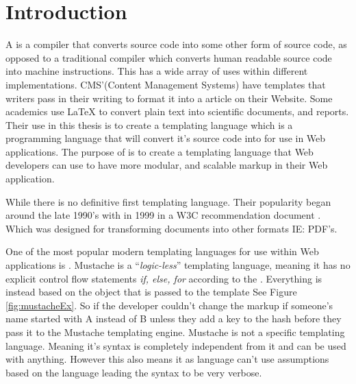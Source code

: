 \section{Introduction}

A \compiler{}  is a compiler that converts source code into some other form of source code, as opposed to a traditional compiler which converts human readable source code into machine instructions. This has a wide array of uses within different implementations. CMS'(Content Management Systems) have templates that writers pass in their writing to format it into a  article on their Website. Some academics use \LaTeX{} to convert plain text into scientific documents, and reports. Their use in this thesis is to create a templating language which is a programming language that will convert it's source code into  for use in Web applications. The purpose of \languageName{} is to create a templating language that Web developers can use to have more modular, and scalable markup in their Web application.

While there is no definitive first templating language. Their popularity began around the late 1990's with  in 1999 in a W3C recommendation document \parencite{XSLT}. Which was designed for transforming  documents into other formats IE: PDF's\parencite{XSLTEx}.
\newpage 

One of the most popular modern templating languages for use within Web applications is \parencite{Mustache}. Mustache is a ``\textit{logic-less}'' templating language, meaning it has no explicit control flow statements \textit{if, else, for} according to the \parencite{MustacheMan}. Everything is instead based on the object that is passed to the template See Figure \ref{fig:mustacheEx}. So if the developer couldn't change the markup if someone's name started with A instead of B unless they add a key to the hash before they pass it to the Mustache templating engine. Mustache is not a  specific templating language. Meaning it's syntax is completely independent from it and can be used with anything. However this also means it as language can't use assumptions based on the language leading the syntax to be very verbose. 

